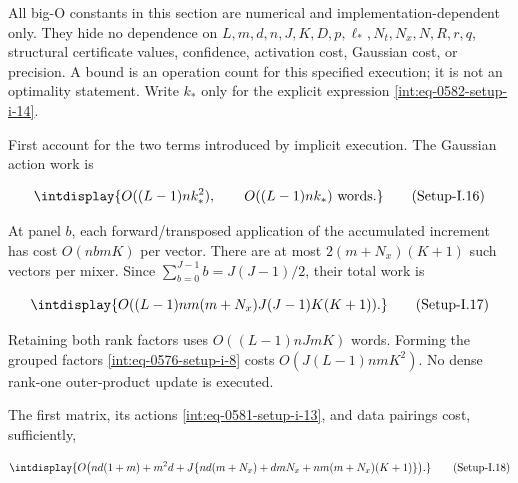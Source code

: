 All big-O constants in this section are numerical and implementation-dependent only. They hide no dependence on \(L,\allowbreak m,\allowbreak d,\allowbreak n,\allowbreak J,\allowbreak K,\allowbreak D,\allowbreak p,\allowbreak \ell_*,\allowbreak N_t,\allowbreak N_x,\allowbreak N,\allowbreak R,\allowbreak r,\allowbreak q\), structural certificate values, confidence, activation cost, Gaussian cost, or precision. A bound is an operation count for this specified execution; it is not an optimality statement. Write \(k_*\) only for the explicit expression \hyperref[int:eq-setup-i-14]{\eqref{int:eq-0582-setup-i-14}}.



First account for the two terms introduced by implicit execution. The Gaussian action work is


\label{int:eq-setup-i-16}
\begingroup\renewcommand{\theHequation}{intdisplay.1099}
\begin{equation}
\intdisplay{
O((L-1)n k_*^2),\qquad O((L-1)n k_*)\ \text{words}.
}
\tag{Setup-I.16}
\label{int:eq-0584-setup-i-16}
\end{equation}
\endgroup


At panel \(b\), each forward/transposed application of the accumulated increment has cost \(O(nbmK)\) per vector. There are at most \(2(m+N_x)(K+1)\) such vectors per mixer. Since \(\sum_{b=0}^{J-1}b=J(J-1)/2\), their total work is


\label{int:eq-setup-i-17}
\begingroup\renewcommand{\theHequation}{intdisplay.1100}
\begin{equation}
\intdisplay{
O((L-1)n m(m+N_x)J(J-1)K(K+1)).
}
\tag{Setup-I.17}
\label{int:eq-0585-setup-i-17}
\end{equation}
\endgroup


Retaining both rank factors uses \(O((L-1)nJmK)\) words. Forming the grouped factors \hyperref[int:eq-setup-i-8]{\eqref{int:eq-0576-setup-i-8}} costs \(O(J(L-1)nmK^2)\). No dense rank-one outer-product update is executed.



The first matrix, its actions \hyperref[int:eq-setup-i-13]{\eqref{int:eq-0581-setup-i-13}}, and data pairings cost, sufficiently,


\label{int:eq-setup-i-18}
\begingroup\renewcommand{\theHequation}{intdisplay.1101}
\begin{equation}
\intdisplay{
O\bigl(nd(1+m)+m^2d
 +J\{nd(m+N_x)+dmN_x+nm(m+N_x)(K+1)\}\bigr).
}
\tag{Setup-I.18}
\label{int:eq-0586-setup-i-18}
\end{equation}
\endgroup

